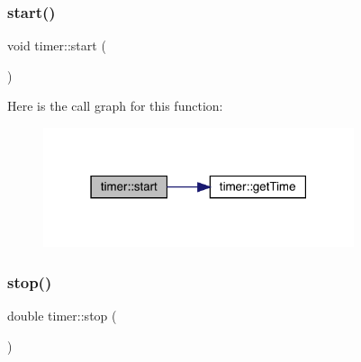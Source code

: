 \subsubsection{\texorpdfstring{start()}{start()}}
{\footnotesize\ttfamily void timer\+::start (\begin{DoxyParamCaption}{ }\end{DoxyParamCaption})\hspace{0.3cm}{\ttfamily [inline]}}

Here is the call graph for this function\+:\nopagebreak
\begin{figure}[H]
\begin{center}
\leavevmode
\includegraphics[width=259pt]{structtimer_a9aa894a57748b2bdf3adce46f5736794_cgraph}
\end{center}
\end{figure}
\mbox{\label{structtimer_a6008e62616dc97a34f52df092cd43cb1}} 
\subsubsection{\texorpdfstring{stop()}{stop()}\hspace{0.1cm}{\footnotesize\ttfamily [1/2]}}
{\footnotesize\ttfamily double timer\+::stop (\begin{DoxyParamCaption}{ }\end{DoxyParamCaption})\hspace{0.3cm}{\ttfamily [inline]}}

